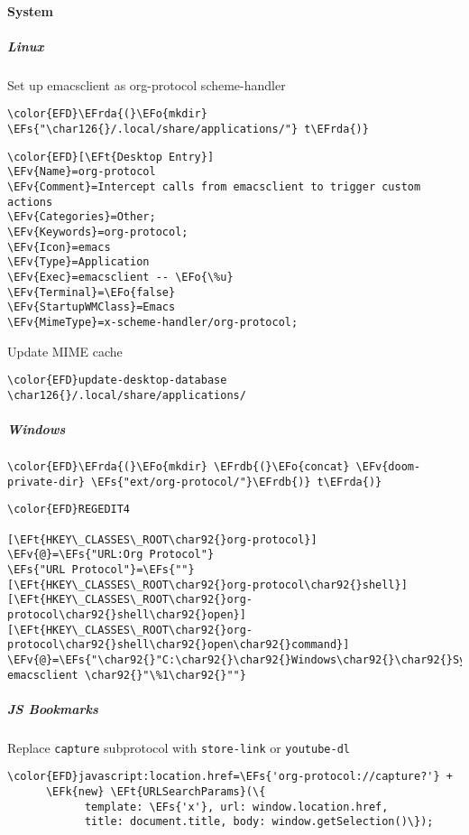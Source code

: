 \documentclass[a4wide,10pt]{article}
\newcommand{\EFs}[1]{\textcolor{EFs}{#1}} %
\newcommand{\EFk}[1]{\textcolor{EFk}{#1}} %
\newcommand{\EFv}[1]{\textcolor{EFv}{#1}} %
\newcommand{\EFt}[1]{\textcolor{EFt}{#1}} %
\newcommand{\EFo}[1]{\textcolor{EFo}{#1}} %
\newcommand{\EFrda}[1]{\textcolor{EFrda}{#1}} %
\newcommand{\EFrdb}[1]{\textcolor{EFrdb}{#1}} %
\begin{document}
\paragraph{System}
\label{sec:org7dddb78}
\subparagraph{Linux}
\label{sec:org1bcd1ed}
Set up emacsclient as org-protocol scheme-handler
\begin{Code}
\begin{Verbatim}
\color{EFD}\EFrda{(}\EFo{mkdir} \EFs{"\char126{}/.local/share/applications/"} t\EFrda{)}
\end{Verbatim}
\end{Code}
\begin{Code}
\begin{Verbatim}
\color{EFD}[\EFt{Desktop Entry}]
\EFv{Name}=org-protocol
\EFv{Comment}=Intercept calls from emacsclient to trigger custom actions
\EFv{Categories}=Other;
\EFv{Keywords}=org-protocol;
\EFv{Icon}=emacs
\EFv{Type}=Application
\EFv{Exec}=emacsclient -- \EFo{\%u}
\EFv{Terminal}=\EFo{false}
\EFv{StartupWMClass}=Emacs
\EFv{MimeType}=x-scheme-handler/org-protocol;
\end{Verbatim}
\end{Code}
Update MIME cache
\begin{Code}
\begin{Verbatim}
\color{EFD}update-desktop-database \char126{}/.local/share/applications/
\end{Verbatim}
\end{Code}
\subparagraph{Windows}
\label{sec:orgb01e47b}
\begin{Code}
\begin{Verbatim}
\color{EFD}\EFrda{(}\EFo{mkdir} \EFrdb{(}\EFo{concat} \EFv{doom-private-dir} \EFs{"ext/org-protocol/"}\EFrdb{)} t\EFrda{)}
\end{Verbatim}
\end{Code}
\begin{Code}
\begin{Verbatim}
\color{EFD}REGEDIT4

[\EFt{HKEY\_CLASSES\_ROOT\char92{}org-protocol}]
\EFv{@}=\EFs{"URL:Org Protocol"}
\EFs{"URL Protocol"}=\EFs{""}
[\EFt{HKEY\_CLASSES\_ROOT\char92{}org-protocol\char92{}shell}]
[\EFt{HKEY\_CLASSES\_ROOT\char92{}org-protocol\char92{}shell\char92{}open}]
[\EFt{HKEY\_CLASSES\_ROOT\char92{}org-protocol\char92{}shell\char92{}open\char92{}command}]
\EFv{@}=\EFs{"\char92{}"C:\char92{}\char92{}Windows\char92{}\char92{}System32\char92{}\char92{}wsl.exe\char92{}" emacsclient \char92{}"\%1\char92{}""}
\end{Verbatim}
\end{Code}
\subparagraph{JS Bookmarks}
\label{sec:orgd219649}
Replace \texttt{capture} subprotocol with \texttt{store-link} or \texttt{youtube-dl}
\begin{Code}
\begin{Verbatim}
\color{EFD}javascript:location.href=\EFs{'org-protocol://capture?'} +
      \EFk{new} \EFt{URLSearchParams}(\{
            template: \EFs{'x'}, url: window.location.href,
            title: document.title, body: window.getSelection()\});
\end{Verbatim}
\end{Code}
\end{document}
